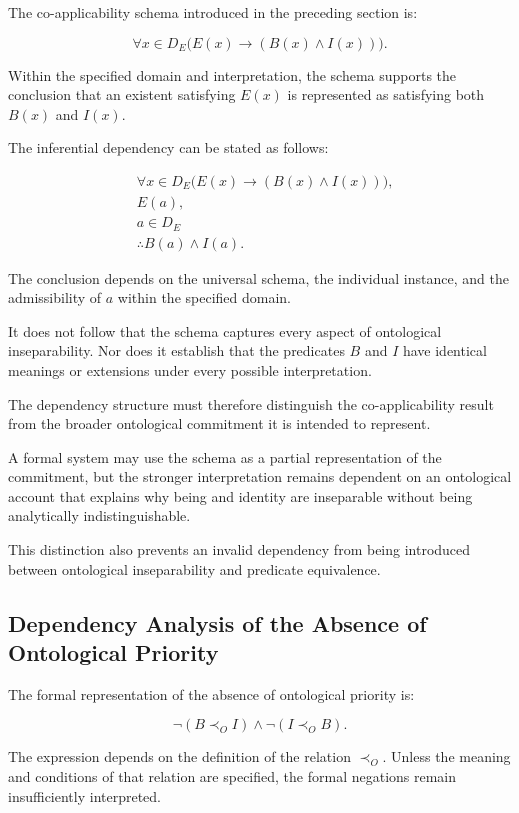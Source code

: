 The co-applicability schema introduced in the preceding section
is:

\[
    \forall x \in D_E
    \bigl(E(x) \rightarrow (B(x) \land I(x))\bigr).
\]

Within the specified domain and interpretation, the schema
supports the conclusion that an existent satisfying \(E(x)\)
is represented as satisfying both \(B(x)\) and \(I(x)\).

The inferential dependency can be stated as follows:

\[
\begin{aligned}
    &\forall x \in D_E
    \bigl(E(x) \rightarrow (B(x) \land I(x))\bigr),\\
    &E(a),\\
    &a \in D_E\\
    &\therefore B(a) \land I(a).
\end{aligned}
\]

The conclusion depends on the universal schema, the individual
instance, and the admissibility of \(a\) within the specified
domain.

It does not follow that the schema captures every aspect of
ontological inseparability. Nor does it establish that the
predicates \(B\) and \(I\) have identical meanings or extensions
under every possible interpretation.

The dependency structure must therefore distinguish the
co-applicability result from the broader ontological commitment
it is intended to represent.

A formal system may use the schema as a partial representation
of the commitment, but the stronger interpretation remains
dependent on an ontological account that explains why being
and identity are inseparable without being analytically
indistinguishable.

This distinction also prevents an invalid dependency from
being introduced between ontological inseparability and
predicate equivalence.

\subsection{Dependency Analysis of the Absence of Ontological
Priority}

The formal representation of the absence of ontological priority
is:

\[
    \neg(B \prec_O I)
    \land
    \neg(I \prec_O B).
\]

The expression depends on the definition of the relation
\(\prec_O\). Unless the meaning and conditions of that relation
are specified, the formal negations remain insufficiently
interpreted.


